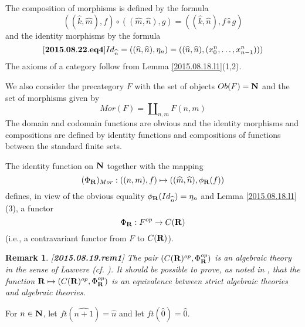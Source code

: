 \documentclass[11pt]{article}
\newenvironment{eq}{\begin{equation}}{\end{equation}}
\newtheorem{remark}[proposition]{Remark}
\newcommand{\llabel}[1]{\label{#1}[{\bf #1}]}
\newcommand{\sr}{\rightarrow}
\newcommand{\nn}{{\bf N\rm}}
\newcommand{\nat}{\nn}
\newcommand{\rr}{{\bf R}}
\newcommand{\wh}{\widehat}
\newcommand{\hc}{\wh{\circ}}
\begin{document}
The composition of morphisms is defined by the formula
%
$$((\wh{k},\wh{m}),f)\circ ((\wh{m},\wh{n}),g)=((\wh{k},\wh{n}),f\hc g)$$
%
and the identity morphisms by the formula
%
\begin{eq}
\llabel{2015.08.22.eq4}
Id_{\wh{n}}=((\wh{n},\wh{n}),\eta_n)=((\wh{n},\wh{n}),(x_0^n,\dots,x^n_{n-1})))
\end{eq}
%
%
The axioms of a category follow from Lemma \ref{2015.08.18.l1}(1,2). 

We also consider the precategory $F$ with the set of objects $Ob(F)=\nn$ and the set of morphisms given by
%
$$Mor(F)=\amalg_{n,m}F(n,m)$$
%
The domain and codomain functions are obvious and the identity morphisms and compositions are defined by identity functions and compositions of functions between the standard finite sets. 

The identity function on $\nn$ together with the mapping
%
$$(\Phi_{\rr})_{Mor}:((n,m),f)\mapsto ((\wh{m},\wh{n}),\phi_{\rr}(f))$$
%
defines, in view of the obvious equality $\phi_{\rr}(Id_{\wh{n}})=\eta_{n}$ and Lemma \ref{2015.08.18.l1}(3), a functor
%
$$\Phi_{\rr}:F^{op}\sr C(\rr)$$
%
(i.e., a contravariant functor from $F$ to $C(\rr)$). 
%
\begin{remark}\rm
\llabel{2015.08.19.rem1}
The pair $(C(\rr)^{op},\Phi^{op}_{\rr})$ is an algebraic theory in the sense of Lawvere (cf. \cite[Definition on p.62]{Lawvere}). It should be possible to prove, as noted in \cite[after Theorem 3.3]{FPT}, that the function $\rr\mapsto (C(\rr)^{op},\Phi^{op}_{\rr})$ is an equivalence between strict algebraic theories and algebraic theories. 
\end{remark}
%

For $n\in\nat$, let $ft(\wh{n+1})=\wh{n}$ and let $ft(\wh{0})=\wh{0}$.
\end{document}
